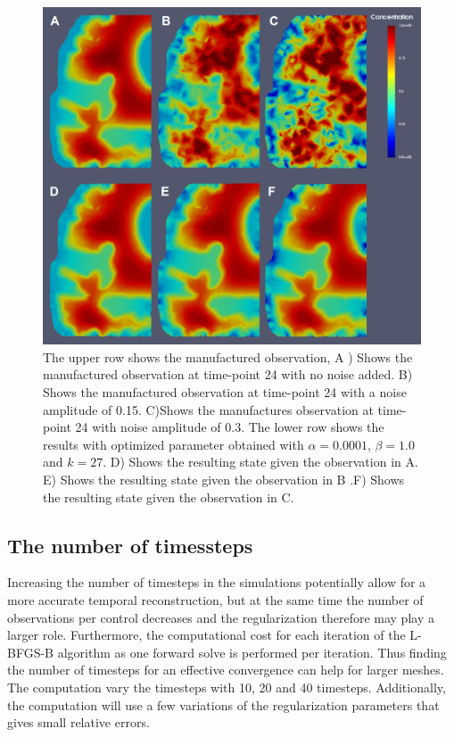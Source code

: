 \documentclass[11pt,a4paper]{article}
\begin{document}
\begin{figure}
\centering
\includegraphics[scale=0.4]{27-24-hours-scale-0-1.png}
\caption{The upper row shows the manufactured observation, A ) Shows the manufactured observation at time-point 24 with no noise added. B) Shows the manufactured observation at time-point 24 with a noise amplitude of 0.15. C)Shows the manufactures observation at time-point 24 with noise amplitude of 0.3. The lower row shows the results with optimized parameter obtained with $\alpha=0.0001$, $\beta=1.0$ and $k=27$. D) Shows the resulting state given the observation in A. E)  Shows the resulting state given the observation in B .F) Shows the resulting state given the observation in C.  }
\label{24hourswithnoise}
\end{figure}


\subsection{The number of timessteps}
Increasing the number of timesteps in the simulations potentially allow for a more accurate temporal reconstruction, but at the same time the number of observations per control decreases and the regularization therefore may play a larger role. Furthermore,  the computational cost for each iteration of the L-BFGS-B algorithm as one
forward solve is performed per iteration. Thus finding the number of timesteps for an effective convergence can help for larger meshes. The computation vary the timesteps with 10, 20 and 40 timesteps. Additionally, the computation will use a few variations of the regularization parameters that gives small relative errors. 
\end{document}

